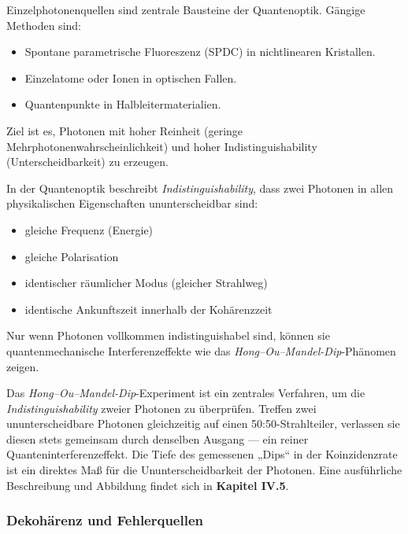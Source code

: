 Einzelphotonenquellen sind zentrale Bausteine der Quantenoptik. Gängige Methoden sind:
\begin{itemize}
	\item Spontane parametrische Fluoreszenz (SPDC) in nichtlinearen Kristallen.
	\item Einzelatome oder Ionen in optischen Fallen.
	\item Quantenpunkte in Halbleitermaterialien.
\end{itemize}
Ziel ist es, Photonen mit hoher Reinheit (geringe Mehrphotonenwahrscheinlichkeit) und hoher Indistinguishability (Unterscheidbarkeit) zu erzeugen.
\vspace{1em}
\begin{tcolorbox}[hinweisbox, title=Was bedeutet „Indistinguishability“? \label{box:indistinguishability}]
	\small
	In der Quantenoptik beschreibt \emph{Indistinguishability}, dass zwei Photonen in allen physikalischen Eigenschaften ununterscheidbar sind:
	\begin{itemize}
		\item gleiche Frequenz (Energie)
		\item gleiche Polarisation
		\item identischer räumlicher Modus (gleicher Strahlweg)
		\item identische Ankunftszeit innerhalb der Kohärenzzeit
	\end{itemize}
	Nur wenn Photonen vollkommen indistinguishabel sind, können sie quantenmechanische Interferenzeffekte wie das \emph{Hong–Ou–Mandel-Dip}-Phänomen zeigen.
\end{tcolorbox}
\vspace{1em}
\begin{tcolorbox}[physikbox, title=Das Hong–Ou–Mandel-Dip-Phänomen \label{box:hong_ou_mandel}]
	\small
	Das \emph{Hong–Ou–Mandel-Dip}-Experiment ist ein zentrales Verfahren, um die \emph{Indistinguishability} zweier Photonen zu überprüfen. Treffen zwei ununterscheidbare Photonen gleichzeitig auf einen 50:50-Strahlteiler, verlassen sie diesen stets gemeinsam durch denselben Ausgang — ein reiner Quanteninterferenzeffekt.  
	Die Tiefe des gemessenen „Dips“ in der Koinzidenzrate ist ein direktes Maß für die Ununterscheidbarkeit der Photonen.  
	Eine ausführliche Beschreibung und Abbildung findet sich in \textbf{Kapitel IV.5}.
\end{tcolorbox}

\subsubsection{Dekohärenz und Fehlerquellen}

